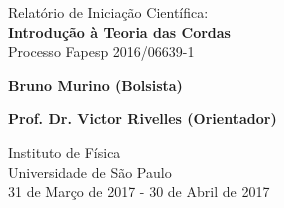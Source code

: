 \begin{titlepage}
    \begin{center}
        \vspace*{10em}
        
        \Large
        Relatório de Iniciação Científica:\\
        \vspace{1em}
        \Huge
        \textbf{Introdução à Teoria das Cordas}\\
        \vspace{1em}
        \large
        Processo Fapesp 2016/06639-1
        
        \vfill
        \begin{flushright}
        \Large
        \textbf{Bruno Murino (Bolsista)}
        
        \vspace{8em}
        \Large
        \textbf{Prof. Dr. Victor Rivelles (Orientador)}
        \end{flushright}
        
        \vspace{8em}
        
        \Large
        Instituto de Física\\
        Universidade de São Paulo\\
        31 de Março de 2017 - 30 de Abril de 2017
        
    \end{center}
\end{titlepage}